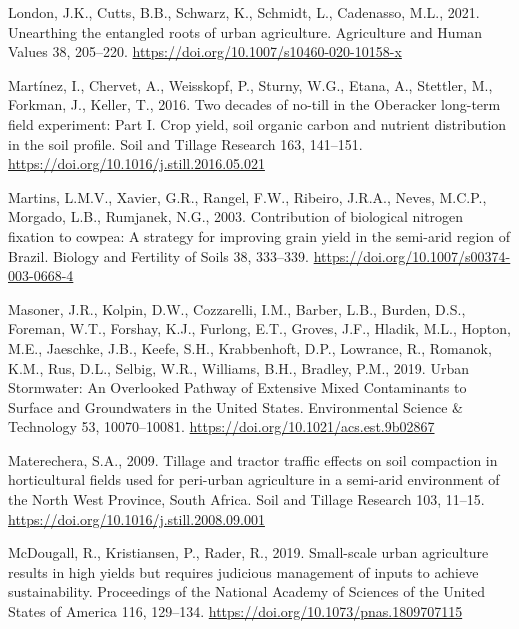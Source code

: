 \documentclass[
  12pt,
]{article}
\newlength{\cslhangindent}
\newlength{\cslentryspacingunit} %
\newenvironment{CSLReferences}[2] %
 {%
  \setlength{\parindent}{0pt}
  \ifodd #1
  \let\oldpar\par
  \def\par{\hangindent=\cslhangindent\oldpar}
  \fi
  \setlength{\parskip}{#2\cslentryspacingunit}
 }%
 {}
\begin{document}
\begin{CSLReferences}{1}{0}
\leavevmode{}%
London, J.K., Cutts, B.B., Schwarz, K., Schmidt, L., Cadenasso, M.L., 2021. Unearthing the entangled roots of urban agriculture. Agriculture and Human Values 38, 205--220. \url{https://doi.org/10.1007/s10460-020-10158-x}

\leavevmode{}%
Martínez, I., Chervet, A., Weisskopf, P., Sturny, W.G., Etana, A., Stettler, M., Forkman, J., Keller, T., 2016. Two decades of no-till in the {Oberacker} long-term field experiment: {Part I}. {Crop} yield, soil organic carbon and nutrient distribution in the soil profile. Soil and Tillage Research 163, 141--151. \url{https://doi.org/10.1016/j.still.2016.05.021}

\leavevmode{}%
Martins, L.M.V., Xavier, G.R., Rangel, F.W., Ribeiro, J.R.A., Neves, M.C.P., Morgado, L.B., Rumjanek, N.G., 2003. Contribution of biological nitrogen fixation to cowpea: A strategy for improving grain yield in the semi-arid region of {Brazil}. Biology and Fertility of Soils 38, 333--339. \url{https://doi.org/10.1007/s00374-003-0668-4}

\leavevmode{}%
Masoner, J.R., Kolpin, D.W., Cozzarelli, I.M., Barber, L.B., Burden, D.S., Foreman, W.T., Forshay, K.J., Furlong, E.T., Groves, J.F., Hladik, M.L., Hopton, M.E., Jaeschke, J.B., Keefe, S.H., Krabbenhoft, D.P., Lowrance, R., Romanok, K.M., Rus, D.L., Selbig, W.R., Williams, B.H., Bradley, P.M., 2019. Urban {Stormwater}: {An Overlooked Pathway} of {Extensive Mixed Contaminants} to {Surface} and {Groundwaters} in the {United States}. Environmental Science \& Technology 53, 10070--10081. \url{https://doi.org/10.1021/acs.est.9b02867}

\leavevmode{}%
Materechera, S.A., 2009. Tillage and tractor traffic effects on soil compaction in horticultural fields used for peri-urban agriculture in a semi-arid environment of the {North West Province}, {South Africa}. Soil and Tillage Research 103, 11--15. \url{https://doi.org/10.1016/j.still.2008.09.001}

\leavevmode{}%
McDougall, R., Kristiansen, P., Rader, R., 2019. Small-scale urban agriculture results in high yields but requires judicious management of inputs to achieve sustainability. Proceedings of the National Academy of Sciences of the United States of America 116, 129--134. \url{https://doi.org/10.1073/pnas.1809707115}


\end{CSLReferences}
\end{document}
